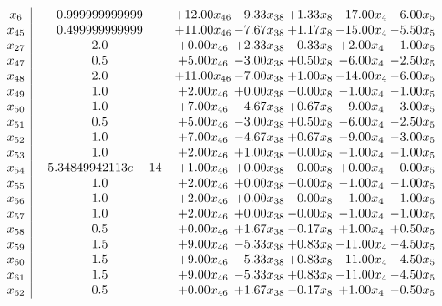 \documentclass[8pt]{article}
\begin{document}
\[\begin{array}{c| c c@{\hskip 2pt} c@{\hskip 2pt} c@{\hskip 2pt} c@{\hskip 2pt} c@{\hskip 2pt} }
 x_{6}   &  0.999999999999 & + 12.00 x_{46} & -9.33 x_{38} & +  1.33 x_{8} & -17.00 x_{4} & -6.00 x_{5}\\
 x_{45}   &  0.499999999999 & + 11.00 x_{46} & -7.67 x_{38} & +  1.17 x_{8} & -15.00 x_{4} & -5.50 x_{5}\\
 x_{27}   &  2.0 & +  0.00 x_{46} & +  2.33 x_{38} & -0.33 x_{8} & +  2.00 x_{4} & -1.00 x_{5}\\
 x_{47}   &  0.5 & +  5.00 x_{46} & -3.00 x_{38} & +  0.50 x_{8} & -6.00 x_{4} & -2.50 x_{5}\\
 x_{48}   &  2.0 & + 11.00 x_{46} & -7.00 x_{38} & +  1.00 x_{8} & -14.00 x_{4} & -6.00 x_{5}\\
 x_{49}   &  1.0 & +  2.00 x_{46} & +  0.00 x_{38} & -0.00 x_{8} & -1.00 x_{4} & -1.00 x_{5}\\
 x_{50}   &  1.0 & +  7.00 x_{46} & -4.67 x_{38} & +  0.67 x_{8} & -9.00 x_{4} & -3.00 x_{5}\\
 x_{51}   &  0.5 & +  5.00 x_{46} & -3.00 x_{38} & +  0.50 x_{8} & -6.00 x_{4} & -2.50 x_{5}\\
 x_{52}   &  1.0 & +  7.00 x_{46} & -4.67 x_{38} & +  0.67 x_{8} & -9.00 x_{4} & -3.00 x_{5}\\
 x_{53}   &  1.0 & +  2.00 x_{46} & +  1.00 x_{38} & -0.00 x_{8} & -1.00 x_{4} & -1.00 x_{5}\\
 x_{54}   &  -5.34849942113e-14 & +  1.00 x_{46} & +  0.00 x_{38} & -0.00 x_{8} & +  0.00 x_{4} & -0.00 x_{5}\\
 x_{55}   &  1.0 & +  2.00 x_{46} & +  0.00 x_{38} & -0.00 x_{8} & -1.00 x_{4} & -1.00 x_{5}\\
 x_{56}   &  1.0 & +  2.00 x_{46} & +  0.00 x_{38} & -0.00 x_{8} & -1.00 x_{4} & -1.00 x_{5}\\
 x_{57}   &  1.0 & +  2.00 x_{46} & +  0.00 x_{38} & -0.00 x_{8} & -1.00 x_{4} & -1.00 x_{5}\\
 x_{58}   &  0.5 & +  0.00 x_{46} & +  1.67 x_{38} & -0.17 x_{8} & +  1.00 x_{4} & +  0.50 x_{5}\\
 x_{59}   &  1.5 & +  9.00 x_{46} & -5.33 x_{38} & +  0.83 x_{8} & -11.00 x_{4} & -4.50 x_{5}\\
 x_{60}   &  1.5 & +  9.00 x_{46} & -5.33 x_{38} & +  0.83 x_{8} & -11.00 x_{4} & -4.50 x_{5}\\
 x_{61}   &  1.5 & +  9.00 x_{46} & -5.33 x_{38} & +  0.83 x_{8} & -11.00 x_{4} & -4.50 x_{5}\\
 x_{62}   &  0.5 & +  0.00 x_{46} & +  1.67 x_{38} & -0.17 x_{8} & +  1.00 x_{4} & -0.50 x_{5}\\

\end{array}\]
\end{document}
